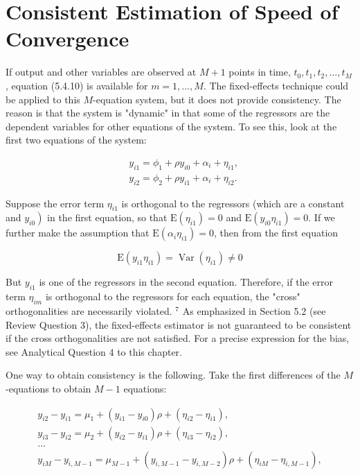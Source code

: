 \documentclass[10pt]{article}
\begin{document}
\section*{Consistent Estimation of Speed of Convergence}
If output and other variables are observed at $M+1$ points in time, $t_{0}, t_{1}, t_{2}, \ldots, t_{M}$, equation (5.4.10) is available for $m=1, \ldots, M$. The fixed-effects technique could be applied to this $M$-equation system, but it does not provide consistency. The reason is that the system is "dynamic" in that some of the regressors are the dependent variables for other equations of the system. To see this, look at the first two equations of the system:

$$
\begin{aligned}
& y_{i 1}=\phi_{1}+\rho y_{i 0}+\alpha_{i}+\eta_{i 1}, \\
& y_{i 2}=\phi_{2}+\rho y_{i 1}+\alpha_{i}+\eta_{i 2} .
\end{aligned}
$$

Suppose the error term $\eta_{i 1}$ is orthogonal to the regressors (which are a constant and $\left.y_{i 0}\right)$ in the first equation, so that $\mathrm{E}\left(\eta_{i 1}\right)=0$ and $\mathrm{E}\left(y_{i 0} \eta_{i 1}\right)=0$. If we further make the assumption that $\mathrm{E}\left(\alpha_{i} \eta_{i 1}\right)=0$, then from the first equation

$$
\mathrm{E}\left(y_{i 1} \eta_{i 1}\right)=\operatorname{Var}\left(\eta_{i 1}\right) \neq 0
$$

But $y_{i 1}$ is one of the regressors in the second equation. Therefore, if the error term $\eta_{i m}$ is orthogonal to the regressors for each equation, the "cross" orthogonalities are necessarily violated. ${ }^{7}$ As emphasized in Section 5.2 (see Review Question 3), the fixed-effects estimator is not guaranteed to be consistent if the cross orthogonalities are not satisfied. For a precise expression for the bias, see Analytical Question 4 to this chapter.

One way to obtain consistency is the following. Take the first differences of the $M$-equations to obtain $M-1$ equations:


\begin{gather*}
y_{i 2}-y_{i 1}=\mu_{1}+\left(y_{i 1}-y_{i 0}\right) \rho+\left(\eta_{i 2}-\eta_{i 1}\right), \\
y_{i 3}-y_{i 2}=\mu_{2}+\left(y_{i 2}-y_{i 1}\right) \rho+\left(\eta_{i 3}-\eta_{i 2}\right), \\
\ldots \\
y_{i M}-y_{i, M-1}=\mu_{M-1}+\left(y_{i, M-1}-y_{i, M-2}\right) \rho+\left(\eta_{i M}-\eta_{i, M-1}\right), \tag{5.4.11}
\end{gather*}
\end{document}
